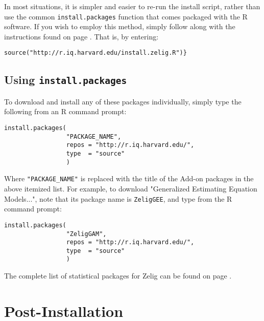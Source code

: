 In most situations, it is simpler and easier to re-run the install script,
rather than use the common {\tt install.packages} function that comes packaged
with the R software. If you wish to employ this method, simply follow along
with the instructions found on page \pageref{subsec:custominstall}. That is, by
entering:

{\indent}\verb|source("http://r.iq.harvard.edu/install.zelig.R")}|

\subsection{Using {\tt install.packages}}

\begin{minipage}{\linewidth}

To download and install any of these packages individually, simply type the
following from an R command prompt:

\begin{verbatim}
install.packages(
                 "PACKAGE_NAME",
                 repos = "http://r.iq.harvard.edu/",
                 type  = "source"
                 )
\end{verbatim}

Where {\tt "PACKAGE\_NAME"} is replaced with the title of the Add-on packages
in the above itemized list. For example, to download "Generalized Estimating
Equation Models...", note that its package name is {\tt ZeligGEE}, and type
from the R command prompt:

\begin{verbatim}
install.packages(
                 "ZeligGAM",
                 repos = "http://r.iq.harvard.edu/",
                 type  = "source"
                 )
\end{verbatim}

The complete list of statistical packages for Zelig can be found on page
\pageref{sec:availablepackages}.


\end{minipage}

%



\section{Post-Installation}

